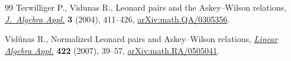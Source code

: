 \documentclass[pdftex]{sigma}%
\numberwithin{equation}{section}
\begin{document}
\begin{thebibliography}{99}
Terwilliger P., Vidunas R., Leonard pairs and the {A}skey--{W}ilson relations,
 \href{https://doi.org/10.1142/S0219498804000940}{\textit{J.~Algebra Appl.}} \textbf{3} (2004), 411--426,
 \href{https://arxiv.org/abs/math.QA/0305356}{arXiv:math.QA/0305356}.

Vid\~unas R., Normalized {L}eonard pairs and {A}skey--{W}ilson relations,
 \href{https://doi.org/10.1016/j.laa.2005.12.033}{\textit{Linear Algebra Appl.}} \textbf{422} (2007), 39--57,
 \href{https://arxiv.org/abs/math.RA/0505041}{arXiv:math.RA/0505041}.

\end{thebibliography}\LastPageEnding
\end{document}
